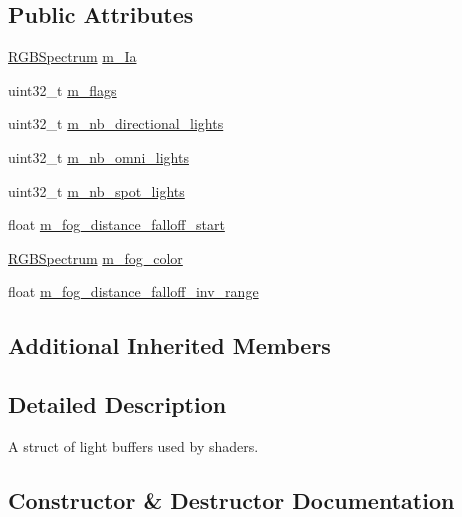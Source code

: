 \subsection*{Public Attributes}
\begin{DoxyCompactItemize}
\item 
\hyperlink{structmage_1_1_r_g_b_spectrum}{R\+G\+B\+Spectrum} \hyperlink{structmage_1_1_light_buffer_a1053a31ecdfdec2d4703376152f6defc}{m\+\_\+\+Ia}
\item 
uint32\+\_\+t \hyperlink{structmage_1_1_light_buffer_adc1532cb0ba1a9f8b87bdacc10df2a8d}{m\+\_\+flags}
\item 
uint32\+\_\+t \hyperlink{structmage_1_1_light_buffer_a9f34a7342a4505a319da50bde8ad2ea4}{m\+\_\+nb\+\_\+directional\+\_\+lights}
\item 
uint32\+\_\+t \hyperlink{structmage_1_1_light_buffer_aa22f6d24cece71b0dccb37b55270c9f6}{m\+\_\+nb\+\_\+omni\+\_\+lights}
\item 
uint32\+\_\+t \hyperlink{structmage_1_1_light_buffer_ae81626222c4b488e896700fe8808e144}{m\+\_\+nb\+\_\+spot\+\_\+lights}
\item 
float \hyperlink{structmage_1_1_light_buffer_ae7f24ab3b764ad3c2db5a95788379628}{m\+\_\+fog\+\_\+distance\+\_\+falloff\+\_\+start}
\item 
\hyperlink{structmage_1_1_r_g_b_spectrum}{R\+G\+B\+Spectrum} \hyperlink{structmage_1_1_light_buffer_aa33b98b2880c519eb5be09f78ce4581e}{m\+\_\+fog\+\_\+color}
\item 
float \hyperlink{structmage_1_1_light_buffer_a730c9c5c1e48f148aa51ebfd8523a347}{m\+\_\+fog\+\_\+distance\+\_\+falloff\+\_\+inv\+\_\+range}
\end{DoxyCompactItemize}
\subsection*{Additional Inherited Members}


\subsection{Detailed Description}
A struct of light buffers used by shaders. 

\subsection{Constructor \& Destructor Documentation}
\hypertarget{structmage_1_1_light_buffer_a5ebb95f741d86b719ad25d56fac3ff66}{}\label{structmage_1_1_light_buffer_a5ebb95f741d86b719ad25d56fac3ff66} 

